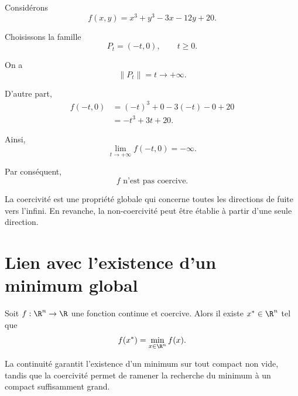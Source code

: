 \begin{exemple}
Considérons
\[
f(x,y)=x^3+y^3-3x-12y+20.
\]

Choisissons la famille
\[
P_t=(-t,0),\qquad t\geq0.
\]

On a
\[
\|P_t\|=t\longrightarrow+\infty.
\]

D'autre part,
\[
\begin{aligned}
f(-t,0)
&=(-t)^3+0-3(-t)-0+20\\
&=-t^3+3t+20.
\end{aligned}
\]

Ainsi,
\[
\lim_{t\to+\infty}f(-t,0)=-\infty.
\]

Par conséquent,
\[
\boxed{f\text{ n'est pas coercive}.}
\]
\end{exemple}

\begin{attention}
La coercivité est une propriété globale qui concerne toutes les directions de fuite vers l'infini. En revanche, la non-coercivité peut être établie à partir d'une seule direction.
\end{attention}

\section{Lien avec l'existence d'un minimum global}

\begin{methode}
Soit $f:\R^n\to\R$ une fonction continue et coercive. Alors il existe $x^*\in\R^n$ tel que
\[
f(x^*)=\min_{x\in\R^n}f(x).
\]

La continuité garantit l'existence d'un minimum sur tout compact non vide, tandis que la coercivité permet de ramener la recherche du minimum à un compact suffisamment grand.
\end{methode}
